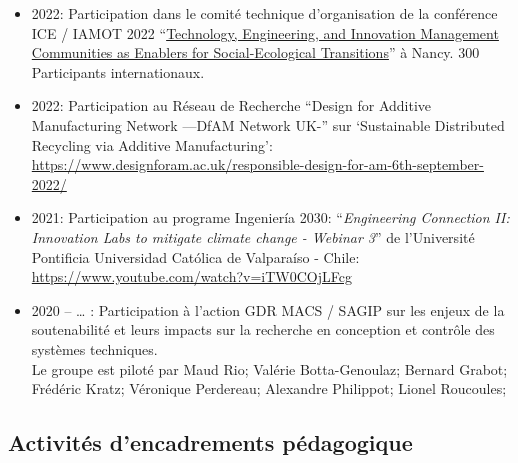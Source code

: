 \documentclass[
  11pt,
]{article}
\begin{document}
\begin{itemize}
\item
  2022: Participation dans le comité technique d'organisation de la
  conférence ICE / IAMOT 2022
  ``\href{https://ice-iamot-2022-conference.org/}{Technology,
  Engineering, and Innovation Management Communities as Enablers for
  Social-Ecological Transitions}'' à Nancy. 300 Participants
  internationaux.
\item
  2022: Participation au Réseau de Recherche ``Design for Additive
  Manufacturing Network ---DfAM Network UK-'' sur `Sustainable
  Distributed Recycling via Additive Manufacturing':
  \url{https://www.designforam.ac.uk/responsible-design-for-am-6th-september-2022/}
\item
  2021: Participation au programe Ingeniería 2030: ``\emph{Engineering
  Connection II: Innovation Labs to mitigate climate change - Webinar
  3}'' de l'Université Pontificia Universidad Católica de Valparaíso -
  Chile: \url{https://www.youtube.com/watch?v=iTW0COjLFcg}
\item
  2020 -- \ldots{} : Participation à l'action GDR MACS / SAGIP sur les
  enjeux de la soutenabilité et leurs impacts sur la recherche en
  conception et contrôle des systèmes techniques.\\
  Le groupe est piloté par Maud Rio; Valérie Botta-Genoulaz; Bernard
  Grabot; Frédéric Kratz; Véronique Perdereau; Alexandre Philippot;
  Lionel Roucoules;
\end{itemize}

\hypertarget{activituxe9s-dencadrements-puxe9dagogique}{%
\subsection{Activités d'encadrements
pédagogique}\label{activituxe9s-dencadrements-puxe9dagogique}}
\end{document}
